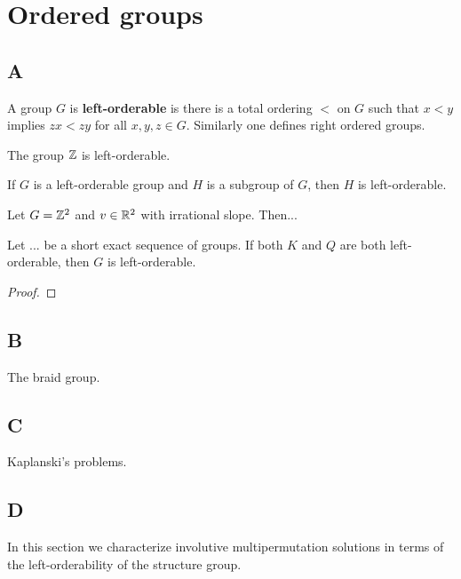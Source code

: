 \chapter{Ordered groups}



\section*{A}

A group $G$ is \textbf{left-orderable} is there is a total ordering $<$ on $G$ 
such that $x<y$ implies $zx<zy$ for all $x,y,z\in G$. Similarly one
defines right ordered groups. 

\begin{example}
The group $\mathbb{Z}$ is left-orderable. 
\end{example}

\begin{example}
If $G$ is a left-orderable group and $H$ is a subgroup of $G$, then $H$ is left-orderable.
\end{example}

\begin{example}
Let $G=\mathbb{Z}^2$ and $v\in\mathbb{R}^2$ with irrational slope. Then...
\end{example}

\begin{proposition}
Let ...
be a short exact sequence of groups. 
If both $K$ and $Q$ are both left-orderable, then $G$ is left-orderable. 
\end{proposition}

\begin{proof}

\end{proof}

\section*{B}

The braid group. 

\section*{C}

Kaplanski's problems. 

\section*{D}

In this section we characterize involutive multipermutation solutions
in terms of the left-orderability of the structure group.  

